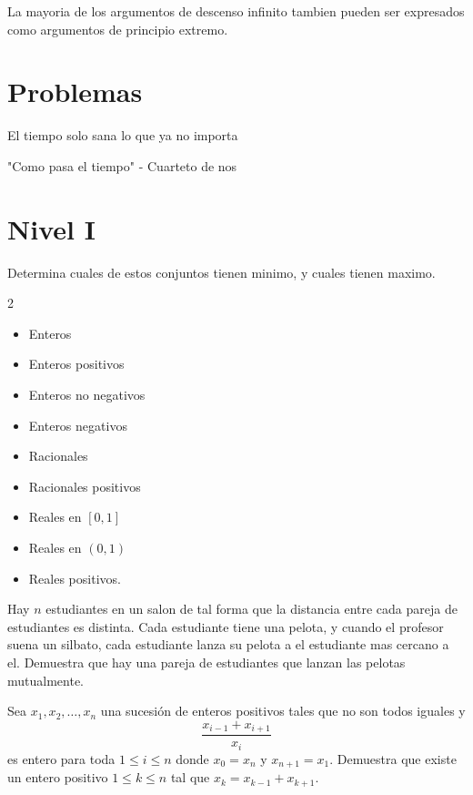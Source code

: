 \documentclass[11pt]{scrartcl}
\newcommand{\thmdifficulty}{0}
\newcommand{\problemdiff}[1]{\renewcommand{\thmdifficulty}{#1}}
\begin{document}
\begin{remark*}
    La mayoria de los argumentos de descenso infinito tambien pueden ser expresados como argumentos de principio extremo.
\end{remark*}

\newpage
\section{Problemas}
\epigraph{El tiempo solo sana lo que ya no importa}{"Como pasa el tiempo" - Cuarteto de nos}

\section{Nivel I}
\problemdiff{1}
\begin{problem}
    Determina cuales de estos conjuntos tienen minimo, y cuales tienen maximo. 
    \begin{multicols}{2}
    \begin{itemize}
        \item Enteros 
        \item Enteros positivos 
        \item Enteros no negativos 
        \item Enteros negativos 
        \item Racionales  
        \item Racionales positivos 
        \item Reales en $[0,1]$
        \item Reales en $(0,1)$
        \item Reales positivos. 
    \end{itemize}
    \end{multicols}
\end{problem}
\problemdiff{2}
\begin{problem}
    Hay $n$ estudiantes en un salon de tal forma que la distancia entre cada pareja de estudiantes es distinta. Cada estudiante tiene una pelota, y cuando el profesor suena un silbato, cada estudiante lanza su pelota a el estudiante mas cercano a el. Demuestra que hay una pareja de estudiantes que lanzan las pelotas mutualmente.
\end{problem}

\problemdiff{2}
\begin{problem} 
    Sea $x_1,x_2,\ldots,x_n$ una sucesión de enteros positivos tales que no son todos iguales y
    \[\frac{x_{i-1}+x_{i+1}}{x_i}\] es entero para toda $1 \leq i \leq n$ donde $x_0=x_n$ y $x_{n+1}=x_1$.  Demuestra que existe un entero positivo $1 \leq k \leq n$ tal que $x_k=x_{k-1}+x_{k+1}$. 
\end{problem}
\end{document}
